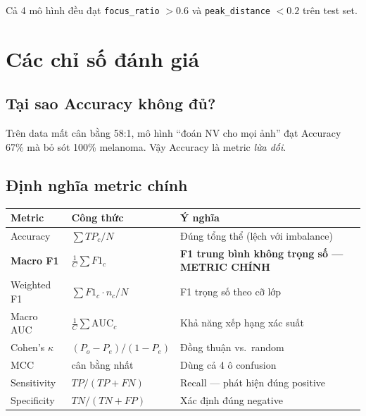 \documentclass[11pt,a4paper]{article}
\begin{document}
Cả 4 mô hình đều đạt \texttt{focus\_ratio} $> 0.6$ và \texttt{peak\_distance} $< 0.2$ trên test set.

\section{Các chỉ số đánh giá}

\subsection{Tại sao Accuracy không đủ?}

\begin{simple}
Trên data mất cân bằng 58:1, mô hình ``đoán NV cho mọi ảnh'' đạt Accuracy 67\% mà bỏ sót 100\% melanoma. Vậy Accuracy là metric \textit{lừa dối}.
\end{simple}

\subsection{Định nghĩa metric chính}

\begin{table}[h]
\centering\small
\begin{tabular}{lll}
\toprule
\textbf{Metric} & \textbf{Công thức} & \textbf{Ý nghĩa} \\
\midrule
Accuracy        & $\sum TP_c / N$            & Đúng tổng thể (lệch với imbalance) \\
\textbf{Macro F1} & $\frac{1}{C}\sum F1_c$  & \textbf{F1 trung bình không trọng số --- METRIC CHÍNH} \\
Weighted F1     & $\sum F1_c \cdot n_c / N$  & F1 trọng số theo cỡ lớp \\
Macro AUC       & $\frac{1}{C}\sum \mathrm{AUC}_c$ & Khả năng xếp hạng xác suất \\
Cohen's $\kappa$ & $(P_o - P_e)/(1 - P_e)$  & Đồng thuận vs.\ random \\
MCC             & cân bằng nhất             & Dùng cả 4 ô confusion \\
Sensitivity     & $TP/(TP+FN)$              & Recall --- phát hiện đúng positive \\
Specificity     & $TN/(TN+FP)$              & Xác định đúng negative \\
\bottomrule
\end{tabular}
\end{table}
\end{document}
